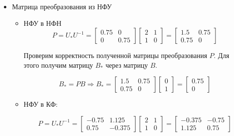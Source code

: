 \begin{itemize}
	\item Матрица преобразования из НФУ
	\begin{itemize}
	\item НФУ в НФН
	\begin{equation*}
	\text{$P=U_{*}U^{-1}=
	\begin{bmatrix} 0.75 &         0 \\
         0  &  0.75 \end{bmatrix}
	\begin{bmatrix} 2 & 1 \\ 1 & 0 \end{bmatrix}
	=\begin{bmatrix}1.5 &   0.75 \\
    0.75 &         0 \end{bmatrix}$}
	\end{equation*}
	
	Проверим корректность полученной матрицы преобразования $P$. Для этого получим матрицу $B_{*}$ через матрицу $B$. 
	
	\begin{equation*}
	\text{$B_{*}=PB$}
	\Longrightarrow
	\text{$B_{*}
	=\begin{bmatrix}1.5 &   0.75 \\
    0.75 &         0 \end{bmatrix}
	\begin{bmatrix} 0 \\ 1 \end{bmatrix}
	=\begin{bmatrix} 0.75 \\ 0 \end{bmatrix}$}
	\end{equation*}
	
	\item НФУ в КФ:
	
	\begin{equation*}
	\text{$P=U_{*}U^{-1}=
	\begin{bmatrix}  -0.75  &  1.125 \\
    0.75  & -0.375 \end{bmatrix}
	\begin{bmatrix} 2 & 1 \\ 1 & 0 \end{bmatrix}
	=\begin{bmatrix} -0.375 &   -0.75 \\
    1.125 &    0.75 \end{bmatrix}$}
	\end{equation*}
	

\end{itemize}
\end{itemize}
